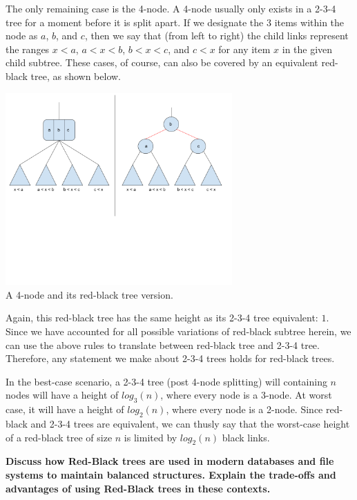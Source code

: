 \documentclass[12pt]{amsart}
\begin{document}
    The only remaining case is the 4-node. A 4-node usually only
    exists in a 2-3-4 tree for a moment before it is split
    apart. If we designate the $3$ items within the node as
    $a$, $b$, and $c$, then we say that (from left to right) the
    child links represent the ranges $x < a$, $a < x < b$,
    $b < x < c$, and $c < x$ for any item $x$ in the given
    child subtree. These cases, of course, can also be covered
    by an equivalent red-black tree, as shown below.

\begin{center}
    \includegraphics[width=0.65\textwidth]{rb_tree_2} \\
    A 4-node and its red-black tree version. \\
    \vskip 1cm
\end{center}

    Again, this red-black tree has the same height as its 2-3-4
    tree equivalent: $1$. Since we have accounted for all
    possible variations of red-black subtree herein, we can use
    the above rules to translate between red-black tree and
    2-3-4 tree. Therefore, any statement we make about 2-3-4
    trees holds for red-black trees.

    In the best-case scenario, a 2-3-4 tree (post 4-node
    splitting) will containing $n$ nodes will have a height of
    $log_3(n)$, where every node is a 3-node. At worst case, it
    will have a height of $log_2(n)$, where every node is a
    2-node. Since red-black and 2-3-4 trees are equivalent, we
    can thusly say that the worst-case height of a red-black
    tree of size $n$ is limited by $log_2(n)$ black links.

    \newpage
    \textbf{Discuss how Red-Black trees are used in modern
    databases and file systems to maintain balanced structures.
    Explain the trade-offs and advantages of using Red-Black
    trees in these contexts.}
\end{document}

